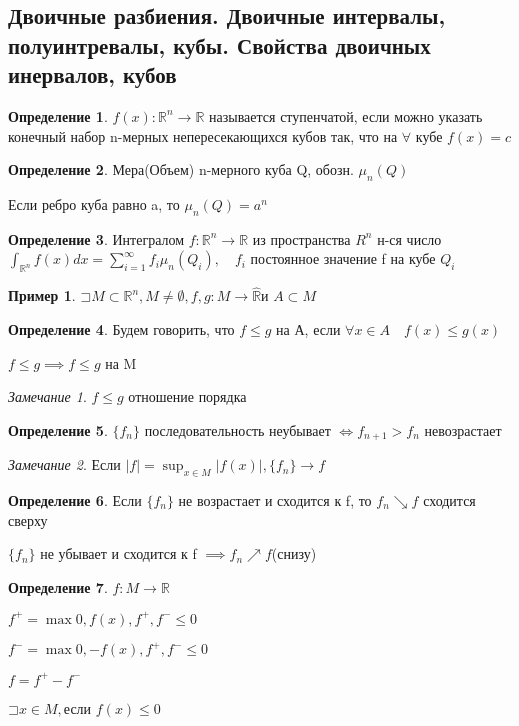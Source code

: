 \documentclass[a4paper]{article}
\newcommand\letsymbol{\mathord{\sqsupset}}
\theoremstyle{definition}
\newtheorem*{example}{Пример}
\newtheorem*{definition}{Определение}
\theoremstyle{remark}
\newtheorem*{remark}{Замечание}
\begin{document}
    \subsection{ Двоичные разбиения. Двоичные интервалы, полуинтревалы, кубы. Свойства двоичных инервалов, кубов}
    \begin{definition}
     $f(x):\mathbb{R}^n \to \mathbb{R} $ называется ступенчатой, если можно указать
     конечный набор n-мерных непересекающихся кубов так, что на $\forall$ кубе $f(x) = c$
\end{definition}
\begin{definition}
     Мера(Объем) n-мерного куба Q, обозн. $\mu_n(Q)$

     Если ребро куба равно a, то $\mu_n(Q) = a^n$
\end{definition}
\begin{definition}
     Интегралом $f:\mathbb{R}^n\to\mathbb{R}$ из пространства $R^n$ н-ся число
     $\int_{\mathbb{R}^n}f(x)dx = \sum_{i = 1}^{\infty} f_i\mu_n(Q_i), \quad f_i$ постоянное значение f на кубе $Q_i$
\end{definition}
\begin{example}
     $\letsymbol{} M \subset \mathbb{R}^n, M \neq \emptyset, f, g: M\to \widehat{\mathbb{R}} $и $A\subset M$
\end{example}
\begin{definition}
     Будем говорить, что $f\leq g$ на А, если $\forall x\in A\quad f(x)\leq g(x)$

     $f\leq g\implies f\leq g$ на M
\end{definition}
\begin{remark}
     $f\leq g$ отношение порядка 
\end{remark}
\begin{definition}
     $\{f_n\}$ последовательность неубывает $\Leftrightarrow f_{n+1}> f_n$ невозрастает
\end{definition}
\begin{remark}
     Если $|f| = \sup_{x\in M} |f(x)|, \{f_n\}\to f$
\end{remark}
\begin{definition}
     Если $\{f_n\}$ не возрастает и сходится к f, то $f_n \searrow f$ сходится сверху
     
     $\{f_n\}$ не убывает и сходится к f $\implies f_n\nearrow f$(снизу)
\end{definition}
\begin{definition}
     $f:M\to\mathbb{R} $

     $f^{+} = \max{0, f(x)}, f^{+}, f^{-}\leq 0$

     $f^{-} = \max{0, -f(x)}, f^{+}, f^{-}\leq 0$

     $f = f^{+} - f^{-}$
\end{definition}
$\letsymbol x\in M,$если $f(x)\leq 0$
\end{document}
